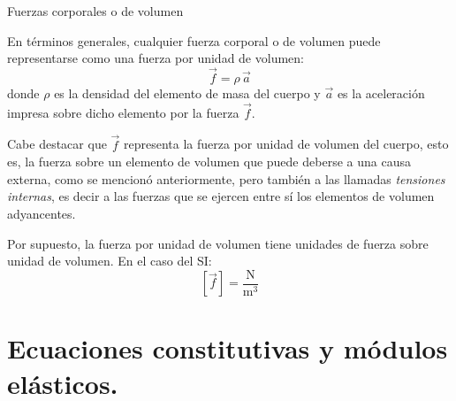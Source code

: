 \documentclass[11pt,handout,aspectratio=1610]{beamer}
\newcommand{\vs}{\vspace{11pt}}
\newcommand{\un}[1]{\text{#1}}
\begin{document}
\begin{frame}{Fuerzas corporales o de volumen}
    
    En términos generales, cualquier fuerza corporal o de volumen puede representarse como una fuerza por unidad de volumen: $$\vec{f} = \rho \, \vec{a}$$ donde $\rho$ es la densidad del elemento de masa del cuerpo y $\vec{a}$ es la aceleración impresa sobre dicho elemento por la fuerza $\vec{f}$.

    \vs

    Cabe destacar que $\vec{f}$ representa la fuerza por unidad de volumen del cuerpo, esto es, la fuerza sobre un elemento de volumen que puede deberse a una causa externa, como se mencionó anteriormente, pero también a las llamadas \emph{tensiones internas}, es decir a las fuerzas que se ejercen entre sí los elementos de volumen adyancentes.

    \vs

    Por supuesto, la fuerza por unidad de volumen tiene unidades de fuerza sobre unidad de volumen. En el caso del SI: $$ \left[\vec{f}\right] = \frac{\un{N}}{\un{m}^3} $$

\end{frame}

\section{Ecuaciones constitutivas y módulos elásticos.}
\end{document}
